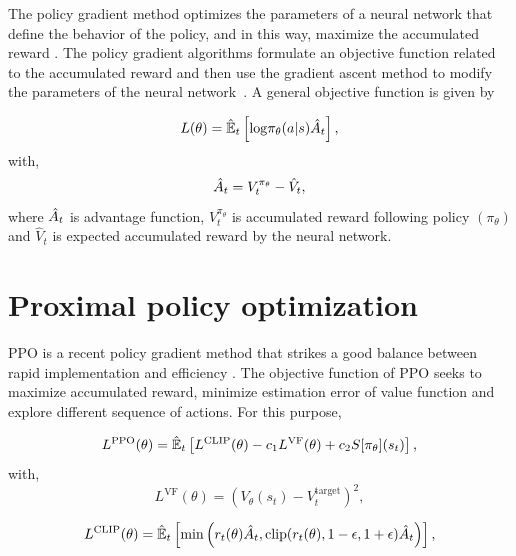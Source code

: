 The policy gradient method optimizes the parameters of a neural network that define the behavior of the policy, and in this way, maximize the accumulated reward \cite{sutton2018reinforcement}. The policy gradient algorithms formulate an objective function related to the accumulated reward and then use the gradient ascent method to modify the parameters of the neural network~\cite{thomas2017policy}. A general objective function is given by

\begin{equation*}
	L(\theta) = \hat{\mathbb{E}}_{t} \left[ \mathrm{log} \pi_\theta (a|s) \hat{A}_{t}  \right],			
\end{equation*}
with,
\begin{equation*}
	\hat{A}_{t} = V^{\pi_{\theta}}_{t}  - \hat{V}_{t}, 
\end{equation*}
\noindent where $\hat{A}_{t}$ is advantage function, $V^{\pi_{\theta}}_{t}$ is accumulated reward following policy $(\pi_\theta)$ and $\hat{V}_{t}$ is expected accumulated reward by the neural network.


\section{Proximal policy optimization}
PPO is a recent policy gradient method that strikes a good balance between rapid implementation and efficiency \cite{schulman2017proximal}. The objective function of PPO seeks to maximize accumulated reward, minimize estimation error of value function and explore different sequence of actions. For this purpose, 


\begin{equation*}
	L^{\mathrm{PPO}}(\theta) = \hat{\mathbb{E}}_{t} \left[  L^{\mathrm{CLIP}}(\theta) - c_1 L^{\mathrm{VF}}(\theta)  + c_2 S[\pi_\theta](s_t)  \right],			
\end{equation*}	
with,
\begin{equation*}
	L^{\mathrm{VF}}(\theta) = \left( V_\theta (s_t) - V^{\mathrm{target}}_{t}  \right)^{2},
\end{equation*}			

\begin{equation*}
	L^{\mathrm{CLIP}}(\theta) = \hat{\mathbb{E}}_{t} \left[ \mathrm{min} \left(  r_{t}(\theta)  \hat{A}_{t},  \mathrm{clip} (r_{t}(\theta) , 1-\epsilon, 1+\epsilon) \hat{A}_{t}  \right)  \right],			
\end{equation*}	







